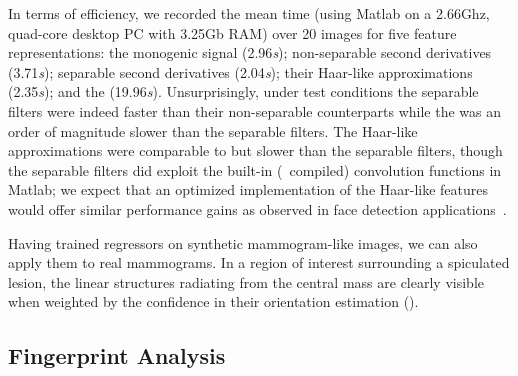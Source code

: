 In terms of efficiency, we recorded the mean time (using Matlab on a 2.66Ghz, quad-core desktop PC with 3.25Gb RAM) over 20 images for five feature representations: the monogenic signal (2.96\emph{s}); non-separable second derivatives (3.71\emph{s}); separable second derivatives (2.04\emph{s}); their Haar-like approximations (2.35\emph{s}); and the \dtcwt{} (19.96\emph{s}). Unsurprisingly, under test conditions the separable filters were indeed faster than their non-separable counterparts while the \dtcwt{} was an order of magnitude slower than the separable filters. The Haar-like approximations were comparable to but slower than the separable filters, though the separable filters did exploit the built-in (\ie~compiled) convolution functions in Matlab; we expect that an optimized implementation of the Haar-like features would offer similar performance gains as observed in face detection applications~\cite{Viola_Jones_IJCV04}.

Having trained regressors on synthetic mammogram-like images, we can also apply them to real mammograms. In a region of interest surrounding a spiculated lesion, the linear structures radiating from the central mass are clearly visible when weighted by the confidence in their orientation estimation ().


\subsection{Fingerprint Analysis}
\label{s:expts_fingerprints}



